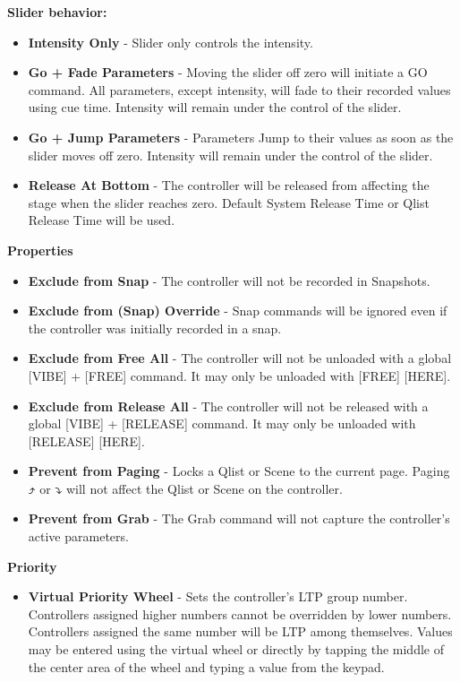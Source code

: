 \documentclass[
]{article}
\providecommand{\tightlist}{%
  \setlength{\itemsep}{0pt}\setlength{\parskip}{0pt}}
\begin{document}
\textbf{Slider behavior:}

\begin{itemize}
\item
  \textbf{Intensity Only} - Slider only controls the intensity.
\item
  \textbf{Go + Fade Parameters} - Moving the slider off zero will initiate a GO command. All parameters, except intensity, will fade to their recorded values using cue time. Intensity will remain under the control of the slider.
\item
  \textbf{Go + Jump Parameters} - Parameters Jump to their values as soon as the slider moves off zero. Intensity will remain under the control of the slider.
\item
  \textbf{Release At Bottom} - The controller will be released from affecting the stage when the slider reaches zero. Default System Release Time or Qlist Release Time will be used.
\end{itemize}

\textbf{Properties}

\begin{itemize}
\item
  \textbf{Exclude from Snap} - The controller will not be recorded in Snapshots.
\item
  \textbf{Exclude from (Snap) Override} - Snap commands will be ignored even if the controller was initially recorded in a snap.
\item
  \textbf{Exclude from Free All} - The controller will not be unloaded with a global {[}VIBE{]} + {[}FREE{]} command. It may only be unloaded with {[}FREE{]} {[}HERE{]}.
\item
  \textbf{Exclude from Release All} - The controller will not be released with a global {[}VIBE{]} + {[}RELEASE{]} command. It may only be unloaded with {[}RELEASE{]} {[}HERE{]}.
\item
  \textbf{Prevent from Paging} - Locks a Qlist or Scene to the current page. Paging ⤴ or ⤵ will not affect the Qlist or Scene on the controller.
\item
  \textbf{Prevent from Grab} - The Grab command will not capture the controller's active parameters.
\end{itemize}

\textbf{Priority}

\begin{itemize}
\tightlist
\item
  \textbf{Virtual Priority Wheel} - Sets the controller's LTP group number. Controllers assigned higher numbers cannot be overridden by lower numbers. Controllers assigned the same number will be LTP among themselves. Values may be entered using the virtual wheel or directly by tapping the middle of the center area of the wheel and typing a value from the keypad.
\end{itemize}
\end{document}
